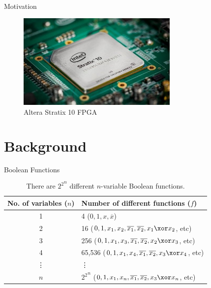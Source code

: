 \documentclass[10pt, compress]{beamer}
\begin{document}
\begin{frame}{Motivation}
    \begin{figure}
        \centering
        \includegraphics[width=0.7\textwidth]{figures/fpga.jpeg}
        \caption{Altera Stratix 10 FPGA}
    \end{figure}
\end{frame}

\section{Background}

\begin{frame}{Boolean Functions}
    \begin{table}[H]
        \centering
        \caption{There are ${2^2}^n$ different $n$-variable Boolean functions.}
        \def\arraystretch{1.5}
        \begin{tabular}{|c|l|}
        \hline
        No. of variables ($n$)  & Number of different functions ($f$)                                               \\ \hline
        1                       & 4 ($0, 1, x, \overline{x}$)	                                                    \\ \hline
        2                       & 16 ($0, 1, x_1, x_2, \overline{x_1}, \overline{x_2}, x_1 \xor x_2$, etc)          \\ \hline
        3                       & 256 ($0, 1, x_1, x_3, \overline{x_1}, \overline{x_2}, x_2 \xor x_3$, etc)         \\ \hline
        4                       & 65,536 ($0, 1, x_1, x_4, \overline{x_1}, \overline{x_2}, x_3 \xor x_4$, etc)      \\ \hline
        \vdots                  & \vdots                                                                            \\ \hline
        $n$                     & ${2^2}^n$ ($0, 1, x_1, x_n, \overline{x_1}, \overline{x_2}, x_3 \xor x_n$, etc)   \\ \hline
        \end{tabular}
    \end{table}
\end{frame}
\end{document}
